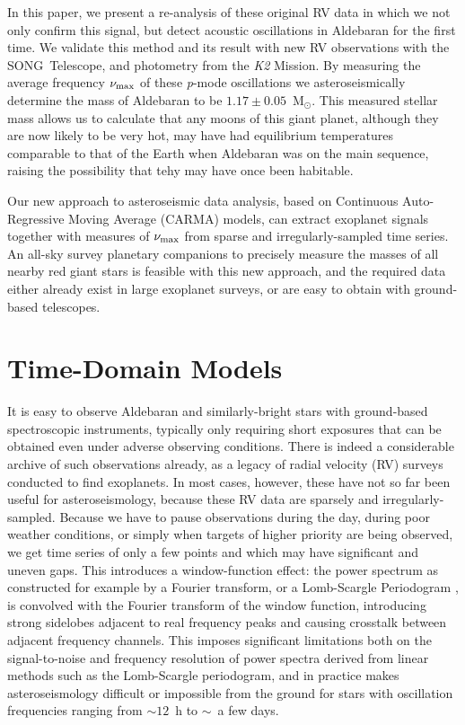 \documentclass[modern]{aastex61}
\newcommand{\numax}{\mbox{$\nu_{\rm max}$}\xspace}
\newcommand{\msun}{\mbox{$\mathrm{M}_{\odot}$}\xspace}
\newcommand{\ktwo}{\emph{K2}\xspace}
\begin{document}
In this paper, we present a re-analysis of these original RV data in which we not only confirm this signal, but detect acoustic oscillations in Aldebaran for the first time. We validate this method and its result with new RV observations with the SONG~Telescope, and photometry from the \ktwo Mission. By measuring the average frequency \numax of these \emph{p}-mode oscillations we asteroseismically determine the mass of Aldebaran to be $1.17 \pm 0.05$~\msun. This measured stellar mass allows us to calculate that any moons of this giant planet, although they are now likely to be very hot, may have had equilibrium temperatures comparable to that of the Earth when Aldebaran was on the main sequence, raising the possibility that tehy may have once been habitable.

Our new approach to asteroseismic data analysis, based on Continuous Auto-Regressive Moving Average (CARMA) models, can extract exoplanet signals together with measures of \numax from sparse and irregularly-sampled time series. An all-sky survey planetary companions to precisely measure the masses of all nearby red giant stars is feasible with this new approach, and the required data either already exist in large exoplanet surveys, or are easy to obtain with ground-based telescopes.

\section{Time-Domain Models}

It is easy to observe Aldebaran and similarly-bright stars with ground-based spectroscopic instruments, typically only requiring short exposures that can be obtained even under adverse observing conditions. There is indeed a considerable archive of such observations already, as a legacy of radial velocity (RV) surveys conducted to find exoplanets. In most cases, however, these have not so far been useful for asteroseismology, because these RV data are sparsely and irregularly-sampled. Because we have to pause observations during the day, during poor weather conditions, or simply when targets of higher priority are being observed, we get time series of only a few points and which may have significant and uneven gaps. This introduces a window-function effect: the power spectrum as constructed for example by a Fourier transform, or a Lomb-Scargle Periodogram \citep{lomb,scargle}, is convolved with the Fourier transform of the window function, introducing strong sidelobes adjacent to real frequency peaks and causing crosstalk between adjacent frequency channels. This imposes significant limitations both on the signal-to-noise and frequency resolution of power spectra derived from linear methods such as the Lomb-Scargle periodogram, and in practice makes asteroseismology difficult or impossible from the ground for stars with oscillation frequencies ranging from $\sim 12$~h to $\sim$~a few days. 
\end{document}
